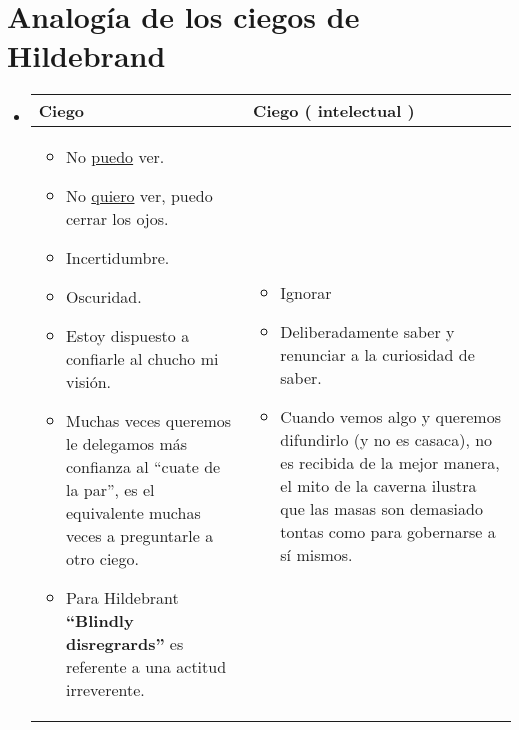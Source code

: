 \section{Analogía de los ciegos de Hildebrand}
\begin{itemize}
    \item \begin{center}
        \begin{tabular}{ | p{5cm} | p{5cm} | }
            \hline
                 Ciego & Ciego ( intelectual )     \\
            \hline
                 \begin{itemize}
                     \item No \underline{puedo} ver.
                     \item No \underline{quiero} ver, puedo cerrar los ojos.
                     \item Incertidumbre. 
                     \item Oscuridad.
                 \end{itemize}
                 \begin{itemize}[label=\#]
                    \item Estoy dispuesto a confiarle al chucho mi visión.
                    \item Muchas veces queremos le delegamos más confianza al ``cuate de la par'', es el equivalente muchas veces a preguntarle a otro ciego.
                    \item Para Hildebrant \textbf{``Blindly disregrards''} es referente a una actitud irreverente.
                 \end{itemize} & 
                 \begin{itemize}
                     \item Ignorar 
                 \end{itemize} 
                 \begin{itemize}[label=\#]
                     \item Deliberadamente saber y renunciar a la curiosidad de saber.
                     \item Cuando vemos algo y queremos difundirlo (y no es casaca), no es recibida de la mejor manera, el mito de la caverna ilustra que las masas son demasiado tontas como para gobernarse a sí mismos.
                 \end{itemize}
                 \\ 
        \end{tabular}
     \end{center}     
     

\end{itemize}
